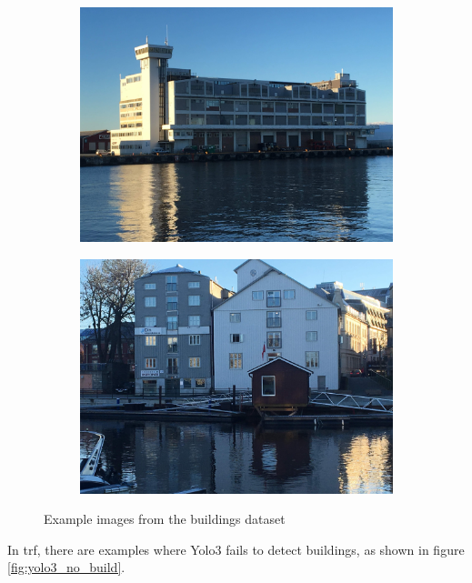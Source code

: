 \begin{figure}[h!]
\begin{subfigure}{.5\textwidth}
  \centering
  \includegraphics[width=0.8\linewidth]{discussion/buildings/IMG_2136.jpg}
\end{subfigure}%
\begin{subfigure}{.5\textwidth}
  \centering
  \includegraphics[width=.8\linewidth]{discussion/buildings/IMG_2085.jpg}
\end{subfigure}
\caption{Example images from the buildings dataset}
\label{fig:buildings}
\end{figure}

In trf, there are examples where Yolo3 fails to detect buildings, as shown in figure \ref{fig:yolo3_no_build}.

